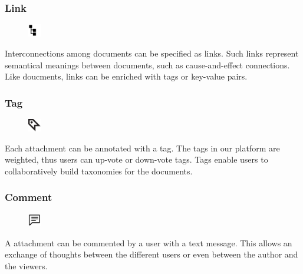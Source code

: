 \documentclass[10pt]{article}
\begin{document}
\subsubsection{Link} 
\begin{figure}
\includegraphics[width=0.05\textwidth]{symbols/symbol_categories.pdf}
\end{figure}
Interconnections among documents can be specified as links. Such links represent semantical meanings between documents, such as cause-and-effect connections. Like doucments, links can be enriched with tags or key-value pairs. \newline


\subsubsection{Tag} 
\begin{figure}
\includegraphics[width=0.05\textwidth]{symbols/symbol_tag.pdf}
\end{figure}
Each attachment can be annotated with a tag. The tags in our platform are weighted, thus users can up-vote or down-vote tags. Tags enable users to collaboratively build taxonomies for the documents. \newline

\subsubsection{Comment} 
\begin{figure}
\includegraphics[width=0.05\textwidth]{symbols/symbol_comment.pdf}
\end{figure}
A attachment can be commented by a user with a text message. This allows an exchange of thoughts between the different users or even between the author and the viewers. \newline
\end{document}
